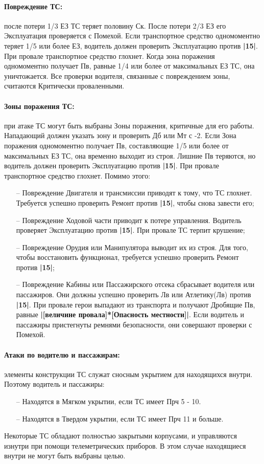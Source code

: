 \paragraph{Повреждение ТС:} после потери 1/3 ЕЗ ТС теряет половину Ск. После потери 2/3 ЕЗ его Эксплуатация проверяется с Помехой.
\newline Если транспортное средство одномоментно теряет 1/5 или более ЕЗ, водитель должен проверить Эксплуатацию против \textbf{|15|}. При провале транспортное средство глохнет.
\newline Когда зона поражения одномоментно получает Пв, равные 1/4 или более от максимальных ЕЗ ТС, она уничтожается. Все проверки водителя, связанные с повреждением зоны, считаются Критически проваленными. 
\paragraph{Зоны поражения ТС:} при атаке ТС могут быть выбраны Зоны поражения, критичные для его работы. Нападающий должен указать зону и проверить Дб или Мт с -2.
\newline Если Зона поражения одномоментно получает Пв, составляющие 1/5 или более от максимальных ЕЗ ТС, она временно выходит из строя. Лишние Пв теряются, но водитель должен проверить Эксплуатацию против \textbf{|15|}. При провале транспортное средство глохнет. Помимо этого:
\begin{itemize}
    \item[--] Повреждение Двигателя и трансмиссии приводят к тому, что ТС глохнет. Требуется успешно проверить Ремонт против \textbf{|15|}, чтобы снова завести его;
    \item[--] Повреждение Ходовой части приводит к потере управления. Водитель проверяет Эксплуатацию против \textbf{|15|}. При провале ТС терпит крушение;
    \item[--] Повреждение Орудия или Манипулятора выводит их из строя. Для того, чтобы восстановить функционал, требуется успешно проверить Ремонт против \textbf{|15|};
    \item[--] Повреждение Кабины или Пассажирского отсека сбрасывает водителя или пассажиров. Они должны успешно проверить Лв или Атлетику(Лв) против \textbf{|15|}. При провале герои выпадают из транспорта и получают Дробящие Пв, равные \textbf{|[величине провала]*[Опасность местности]|}. Если водитель и пассажиры пристегнуты ремнями безопасности, они совершают проверки с Помехой.
\end{itemize}
\paragraph{Атаки по водителю и пассажирам:} элементы конструкции ТС служат сносным укрытием для находящихся внутри. Поэтому водитель и пассажиры:
\begin{itemize}
    \item[--] Находятся в Мягком укрытии, если ТС имеет Прч 5 - 10.
    \item[--] Находятся в Твердом укрытии, если ТС имеет Прч 11 и больше.
\end{itemize}
Некоторые ТС обладают полностью закрытыми корпусами, и управляются изнутри при помощи телеметрических приборов. В этом случае находящиеся внутри не могут быть выбраны целью.
